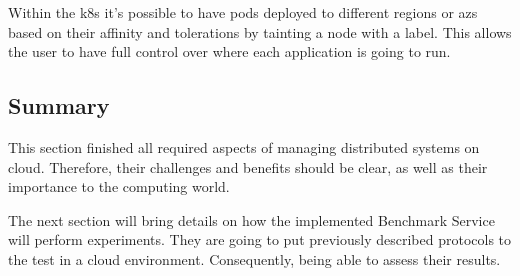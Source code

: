 Within the \gls{k8s} it’s possible to have pods deployed to different regions or \gls{az}s based on their affinity and tolerations by tainting a node with a label. This allows the user to have full control over where each application is going to run.

\subsection{Summary}

This section finished all required aspects of managing distributed systems on cloud. Therefore, their challenges and benefits should be clear, as well as their importance to the computing world.

The next section will bring details on how the implemented Benchmark Service will perform experiments. They are going to put previously described protocols to the test in a cloud environment. Consequently, being able to assess their results.

